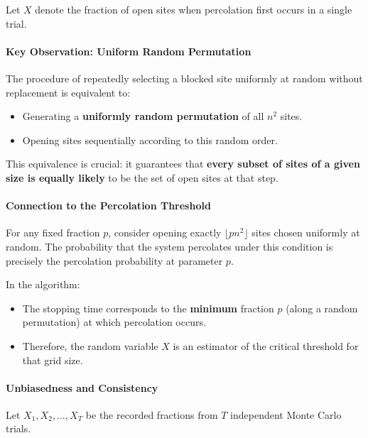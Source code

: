 \documentclass[11pt]{article}
\providecommand{\tightlist}{%
      \setlength{\itemsep}{0pt}\setlength{\parskip}{0pt}}
\begin{document}
Let \(X\) denote the fraction of open sites when percolation first
occurs in a single trial.

\paragraph{Key Observation: Uniform Random
Permutation}\label{key-observation-uniform-random-permutation}

The procedure of repeatedly selecting a blocked site uniformly at random
without replacement is equivalent to:

\begin{itemize}
\tightlist
\item
  Generating a \textbf{uniformly random permutation} of all \(n^2\)
  sites.
\item
  Opening sites sequentially according to this random order.
\end{itemize}

This equivalence is crucial: it guarantees that \textbf{every subset of
sites of a given size is equally likely} to be the set of open sites at
that step.

\paragraph{Connection to the Percolation
Threshold}\label{connection-to-the-percolation-threshold}

For any fixed fraction \(p\), consider opening exactly
\(\lfloor pn^2\rfloor\) sites chosen uniformly at random. The
probability that the system percolates under this condition is precisely
the percolation probability at parameter \(p\).

In the algorithm:

\begin{itemize}
\tightlist
\item
  The stopping time corresponds to the \textbf{minimum} fraction \(p\)
  (along a random permutation) at which percolation occurs.
\item
  Therefore, the random variable \(X\) is an estimator of the critical
  threshold for that grid size.
\end{itemize}

\paragraph{Unbiasedness and
Consistency}\label{unbiasedness-and-consistency}

Let \(X_1, X_2, \dots, X_T\) be the recorded fractions from \(T\)
independent Monte Carlo trials.
\end{document}
